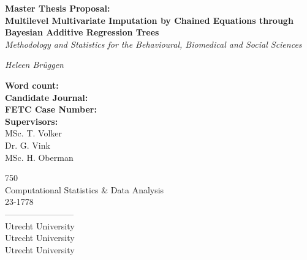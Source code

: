\documentclass[10pt, a4paper, titlepage]{article}
\begin{document}
\begin{titlingpage}
\begin{center}
\Huge\textbf{Master Thesis Proposal:  \\ Multilevel Multivariate Imputation by Chained Equations through Bayesian Additive Regression Trees} \\
\Large\textit{Methodology and Statistics for the Behavioural, Biomedical and Social Sciences}

\vspace{.5cm}

\normalsize\textit{Heleen Brüggen}

\vspace{15cm}

\begin{minipage}{0.5\textwidth}
\begin{flushleft}

\textbf{Word count:} \\
\textbf{Candidate Journal:} \\
\textbf{FETC Case Number:} \\
\textbf{Supervisors:} \\
MSc. T. Volker \\
Dr. G. Vink \\
 MSc. H. Oberman
\end{flushleft}
\end{minipage}%
\begin{minipage}{0.5\textwidth}
\begin{flushright}

750 \\
Computational Statistics \& Data Analysis \\
23-1778 \\
------------------------\\
Utrecht University \\
Utrecht University \\
Utrecht University
\end{flushright}
\end{minipage}

\end{center}
\end{titlingpage}

\newpage
\end{document}
